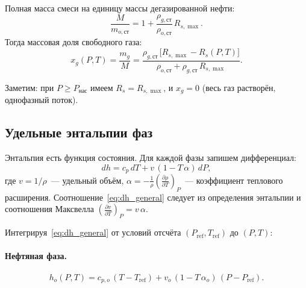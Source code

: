 \documentclass[12pt,a4paper]{article}
\begin{document}
Полная масса смеси на единицу массы дегазированной нефти:
\begin{equation}\label{eq:M_spec}
  \frac{M}{m_{o,\text{ст}}}
    = 1 + \frac{\rho_{g,\text{ст}}}{\rho_{o,\text{ст}}}\,R_{s,\max}.
\end{equation}
Тогда массовая доля свободного газа:
\begin{equation}\label{eq:xg}
  \boxed{\;
    x_g(P,T) = \frac{m_g}{M}
    = \frac{\rho_{g,\text{ст}}\,\bigl[R_{s,\max} - R_s(P,T)\bigr]}
           {\rho_{o,\text{ст}} + \rho_{g,\text{ст}}\,R_{s,\max}}.
  \;}
\end{equation}

Заметим: при $P \geqslant P_{\text{нас}}$ имеем $R_s = R_{s,\max}$, и
$x_g = 0$ (весь газ растворён, однофазный поток).

\subsection{Удельные энтальпии фаз}

Энтальпия есть функция состояния. Для каждой фазы запишем
дифференциал:
\begin{equation}\label{eq:dh_general}
  dh = c_p\,dT + v\,(1 - T\,\alpha)\,dP,
\end{equation}
где $v = 1/\rho$~--- удельный объём, $\alpha = -\frac{1}{\rho}
\left(\frac{\partial\rho}{\partial T}\right)_P$~--- коэффициент теплового
расширения. Соотношение~\eqref{eq:dh_general} следует из определения
энтальпии и соотношения Максвелла $\left(\frac{\partial v}{\partial T}
\right)_P = v\,\alpha$.

Интегрируя~\eqref{eq:dh_general} от условий отсчёта
$(P_{\mathrm{ref}}, T_{\mathrm{ref}})$ до $(P,T)$:

\paragraph{Нефтяная фаза.}
\begin{equation}\label{eq:Ho}
  h_o(P,T) = c_{p,o}\,(T - T_{\mathrm{ref}})
            + v_o\,(1 - T\,\alpha_o)\,(P - P_{\mathrm{ref}}).
\end{equation}
\end{document}
